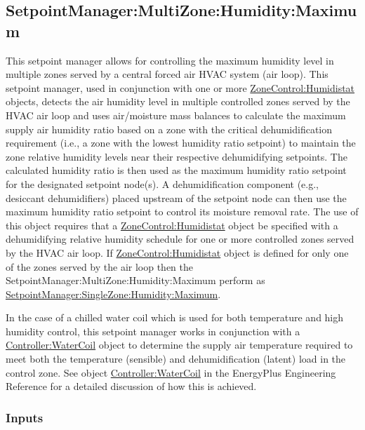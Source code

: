 \subsection{SetpointManager:MultiZone:Humidity:Maximum}\label{setpointmanagermultizonehumiditymaximum}

This setpoint manager allows for controlling the maximum humidity level in multiple zones served by a central forced air HVAC system (air loop). This setpoint manager, used in conjunction with one or more \hyperref[zonecontrolhumidistat]{ZoneControl:Humidistat} objects, detects the air humidity level in multiple controlled zones served by the HVAC air loop and uses air/moisture mass balances to calculate the maximum supply air humidity ratio based on a zone with the critical dehumidification requirement (i.e., a zone with the lowest humidity ratio setpoint) to maintain the zone relative humidity levels near their respective dehumidifying setpoints. The calculated humidity ratio is then used as the maximum humidity ratio setpoint for the designated setpoint node(s). A dehumidification component (e.g., desiccant dehumidifiers) placed upstream of the setpoint node can then use the maximum humidity ratio setpoint to control its moisture removal rate. The use of this object requires that a \hyperref[zonecontrolhumidistat]{ZoneControl:Humidistat} object be specified with a dehumidifying relative humidity schedule for one or more controlled zones served by the HVAC air loop. If \hyperref[zonecontrolhumidistat]{ZoneControl:Humidistat} object is defined for only one of the zones served by the air loop then the SetpointManager:MultiZone:Humidity:Maximum perform as \hyperref[setpointmanagersinglezonehumiditymaximum]{SetpointManager:SingleZone:Humidity:Maximum}.

In the case of a chilled water coil which is used for both temperature and high humidity control, this setpoint manager works in conjunction with a \hyperref[controllerwatercoil]{Controller:WaterCoil} object to determine the supply air temperature required to meet both the temperature (sensible) and dehumidification (latent) load in the control zone. See object \hyperref[controllerwatercoil]{Controller:WaterCoil} in the EnergyPlus Engineering Reference for a detailed discussion of how this is achieved.

\subsubsection{Inputs}\label{inputs-19-005}

